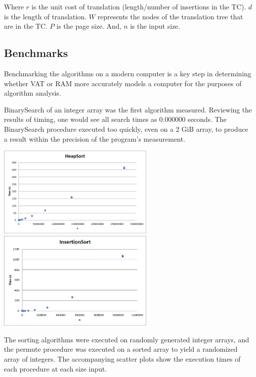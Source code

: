     Where $r$ is the unit cost of translation (length/number of insertions in
    the TC). $d$ is the length of translation. $W$ represents the nodes of the
    translation tree that are in the TC. $P$ is the page size. And, $n$ is the
    input size.
  
  \subsection{Benchmarks}
    Benchmarking the algorithms on a modern computer is a key step in
    determining whether VAT or RAM more accurately models a computer for the
    purposes of algorithm analysis.
    
    BinarySearch of an integer array was the first algorithm measured.
    Reviewing the results of timing, one would see all search times as 0.000000
    seconds. The BinarySearch procedure executed too quickly, even on a 2 GiB
    array, to produce a result within the precision of the program's
    measurement.
   \begin{center}
    \includegraphics[width=3in]{heapsort.png}
    \includegraphics[width=3in]{insertionsort.png}
   \end{center}
    
    The sorting algorithms were executed on randomly generated integer arrays,
    and the permute procedure was executed on a sorted array to yield a
    randomized array of integers. The accompanying scatter plots show the
    execution times of each procedure at each size input.
    

